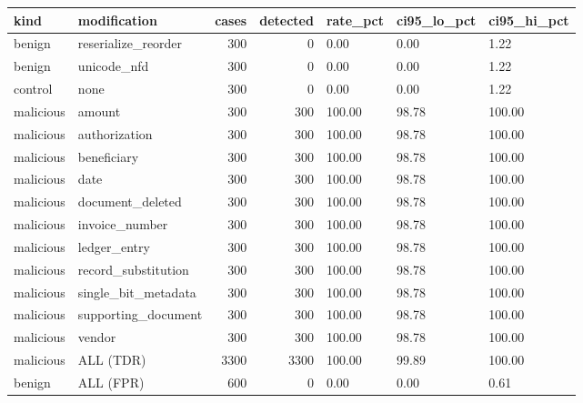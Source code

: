 \begin{tabular}{llrrlll}
\toprule
kind & modification & cases & detected & rate\_pct & ci95\_lo\_pct & ci95\_hi\_pct \\
\midrule
benign & reserialize\_reorder & 300 & 0 & 0.00 & 0.00 & 1.22 \\
benign & unicode\_nfd & 300 & 0 & 0.00 & 0.00 & 1.22 \\
control & none & 300 & 0 & 0.00 & 0.00 & 1.22 \\
malicious & amount & 300 & 300 & 100.00 & 98.78 & 100.00 \\
malicious & authorization & 300 & 300 & 100.00 & 98.78 & 100.00 \\
malicious & beneficiary & 300 & 300 & 100.00 & 98.78 & 100.00 \\
malicious & date & 300 & 300 & 100.00 & 98.78 & 100.00 \\
malicious & document\_deleted & 300 & 300 & 100.00 & 98.78 & 100.00 \\
malicious & invoice\_number & 300 & 300 & 100.00 & 98.78 & 100.00 \\
malicious & ledger\_entry & 300 & 300 & 100.00 & 98.78 & 100.00 \\
malicious & record\_substitution & 300 & 300 & 100.00 & 98.78 & 100.00 \\
malicious & single\_bit\_metadata & 300 & 300 & 100.00 & 98.78 & 100.00 \\
malicious & supporting\_document & 300 & 300 & 100.00 & 98.78 & 100.00 \\
malicious & vendor & 300 & 300 & 100.00 & 98.78 & 100.00 \\
malicious & ALL (TDR) & 3300 & 3300 & 100.00 & 99.89 & 100.00 \\
benign & ALL (FPR) & 600 & 0 & 0.00 & 0.00 & 0.61 \\
\bottomrule
\end{tabular}
